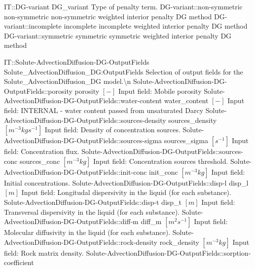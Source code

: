 \begin{SelectionType}
	{IT::DG-variant}
	{DG{\_}variant}
	{{{Type of penalty term.}%
}}
		\SelectionItem
			{DG-variant::non-symmetric}
			{non-symmetric}
			{{{non-symmetric weighted interior penalty DG method}%
}}
		\SelectionItem
			{DG-variant::incomplete}
			{incomplete}
			{{{incomplete weighted interior penalty DG method}%
}}
		\SelectionItem
			{DG-variant::symmetric}
			{symmetric}
			{{{symmetric weighted interior penalty DG method}%
}}
\end{SelectionType}
\begin{SelectionType}
	{IT::Solute-AdvectionDiffusion-DG-OutputFields}
	{Solute{\_}AdvectionDiffusion{\_}DG:OutputFields}
	{{{Selection of output fields for the Solute{\_}AdvectionDiffusion{\_}DG model.{\textbackslash}n}%
}}
		\SelectionItem
			{Solute-AdvectionDiffusion-DG-OutputFields::porosity}
			{porosity}
			{{{}{$[-]$}{ Input field: Mobile porosity}%
}}
		\SelectionItem
			{Solute-AdvectionDiffusion-DG-OutputFields::water-content}
			{water{\_}content}
			{{{}{$[-]$}{ Input field: INTERNAL - water content passed from unsaturated Darcy}%
}}
		\SelectionItem
			{Solute-AdvectionDiffusion-DG-OutputFields::sources-density}
			{sources{\_}density}
			{{{}{$[m^{-3}kgs^{-1}]$}{ Input field: Density of concentration sources.}%
}}
		\SelectionItem
			{Solute-AdvectionDiffusion-DG-OutputFields::sources-sigma}
			{sources{\_}sigma}
			{{{}{$[s^{-1}]$}{ Input field: Concentration flux.}%
}}
		\SelectionItem
			{Solute-AdvectionDiffusion-DG-OutputFields::sources-conc}
			{sources{\_}conc}
			{{{}{$[m^{-3}kg]$}{ Input field: Concentration sources threshold.}%
}}
		\SelectionItem
			{Solute-AdvectionDiffusion-DG-OutputFields::init-conc}
			{init{\_}conc}
			{{{}{$[m^{-3}kg]$}{ Input field: Initial concentrations.}%
}}
		\SelectionItem
			{Solute-AdvectionDiffusion-DG-OutputFields::disp-l}
			{disp{\_}l}
			{{{}{$[m]$}{ Input field: Longitudal dispersivity in the liquid (for each substance).}%
}}
		\SelectionItem
			{Solute-AdvectionDiffusion-DG-OutputFields::disp-t}
			{disp{\_}t}
			{{{}{$[m]$}{ Input field: Transversal dispersivity in the liquid (for each substance).}%
}}
		\SelectionItem
			{Solute-AdvectionDiffusion-DG-OutputFields::diff-m}
			{diff{\_}m}
			{{{}{$[m^{2}s^{-1}]$}{ Input field: Molecular diffusivity in the liquid (for each substance).}%
}}
		\SelectionItem
			{Solute-AdvectionDiffusion-DG-OutputFields::rock-density}
			{rock{\_}density}
			{{{}{$[m^{-3}kg]$}{ Input field: Rock matrix density.}%
}}
		\SelectionItem
			{Solute-AdvectionDiffusion-DG-OutputFields::sorption-coefficient}

\end{SelectionType}
